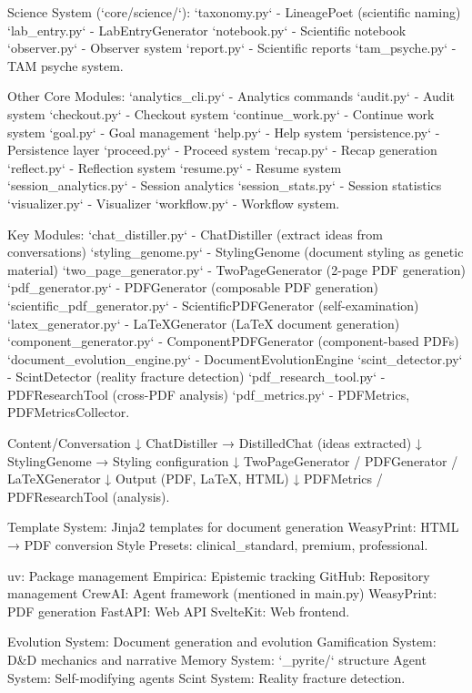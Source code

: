 \documentclass[11pt,letterpaper]{article}
\begin{document}
Science System (`core/science/`): `taxonomy.py` - LineagePoet (scientific naming) `lab\_entry.py` - LabEntryGenerator `notebook.py` - Scientific notebook `observer.py` - Observer system `report.py` - Scientific reports `tam\_psyche.py` - TAM psyche system.

Other Core Modules: `analytics\_cli.py` - Analytics commands `audit.py` - Audit system `checkout.py` - Checkout system `continue\_work.py` - Continue work system `goal.py` - Goal management `help.py` - Help system `persistence.py` - Persistence layer `proceed.py` - Proceed system `recap.py` - Recap generation `reflect.py` - Reflection system `resume.py` - Resume system `session\_analytics.py` - Session analytics `session\_stats.py` - Session statistics `visualizer.py` - Visualizer `workflow.py` - Workflow system.

Key Modules: `chat\_distiller.py` - ChatDistiller (extract ideas from conversations) `styling\_genome.py` - StylingGenome (document styling as genetic material) `two\_page\_generator.py` - TwoPageGenerator (2-page PDF generation) `pdf\_generator.py` - PDFGenerator (composable PDF generation) `scientific\_pdf\_generator.py` - ScientificPDFGenerator (self-examination) `latex\_generator.py` - LaTeXGenerator (LaTeX document generation) `component\_generator.py` - ComponentPDFGenerator (component-based PDFs) `document\_evolution\_engine.py` - DocumentEvolutionEngine `scint\_detector.py` - ScintDetector (reality fracture detection) `pdf\_research\_tool.py` - PDFResearchTool (cross-PDF analysis) `pdf\_metrics.py` - PDFMetrics, PDFMetricsCollector.

Content/Conversation ↓ ChatDistiller → DistilledChat (ideas extracted) ↓ StylingGenome → Styling configuration ↓ TwoPageGenerator / PDFGenerator / LaTeXGenerator ↓ Output (PDF, LaTeX, HTML) ↓ PDFMetrics / PDFResearchTool (analysis).

Template System: Jinja2 templates for document generation WeasyPrint: HTML → PDF conversion Style Presets: clinical\_standard, premium, professional.

uv: Package management Empirica: Epistemic tracking GitHub: Repository management CrewAI: Agent framework (mentioned in main.py) WeasyPrint: PDF generation FastAPI: Web API SvelteKit: Web frontend.

Evolution System: Document generation and evolution Gamification System: D\&D mechanics and narrative Memory System: `\_pyrite/` structure Agent System: Self-modifying agents Scint System: Reality fracture detection.
\end{document}
